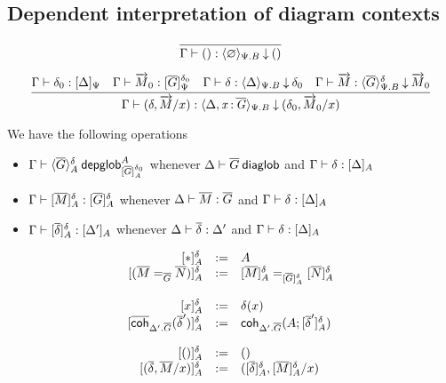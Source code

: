 \subsection{Dependent interpretation of diagram contexts}


\begin{small}
  \[\infer{\ofinterpdep{\Gamma}{()}{\emptyctx}{\Psi.B}{()}}{}\]

  \[
  \infer{\ofinterpdep{\Gamma}{(\delta,\tel M/x)}
    {\Delta,\tptm{x}{\diag G}}{\Psi.B}{(\delta_0,\tel M_0/x)}}
  {\ofinterp{\Gamma}{\delta_0}{\Delta}{\Psi}
    & \ofglob{\Gamma}{\tel M_0}{\interpglob{\diag G}{\Psi}{\delta_0}}
    & \ofinterpdep{\Gamma}{\delta}{\Delta}{\Psi.B}{\delta_0}
    & \ofdepglob{\Gamma}{\tel M}{\interpdepglob{\diag G}{\Psi.B}{\delta}}{\tel
    M_0}}
    \]
\end{small}

We have the following operations

\begin{itemize}
\item ${\Gamma} \vdash {\langle {\ensuremath{\overline{G}}}\rangle_{A}^{\delta}} \: \mathsf{depglob}^{A}_{
        [{\overline{G}}]_{A}^{\delta_0}}$ whenever
  ${\Delta} \vdash {\ensuremath{\overline{G}}} \: \mathsf{diaglob}$ and ${\Gamma} \vdash {\delta} : {[ \Delta ]_{A}}$
\item ${\Gamma} \vdash {[{\ensuremath{\overline{M}}}]_{A}^{\delta}} : {} {[{\overline{G}}]_{A}^{\delta}}$ whenever ${\Delta} \vdash {\ensuremath{\overline{M}}} : {\overline{G}}$ and
  ${\Gamma} \vdash {\delta} : {[ \Delta ]_{A}}$
\item ${\Gamma} \vdash {[{\ensuremath{\overline{\delta}}}]_{A}^{\delta}} : {[ \Delta' ]_{A}}$
  whenever ${\Delta} \vdash {\ensuremath{\overline{\delta}}} : {\Delta'}$ and
  ${\Gamma} \vdash {\delta} : {[ \Delta ]_{A}}$
\end{itemize}

\begin{small}
  \[
  \begin{array}{rcl}
    \interpglob{\diagbase}{A}{\delta} & := & A \\
    \interpglob{(\homj{\diag G}{\diag M}{\diag N})}{A}{\delta} & := &
    \homj{\interpglob{\diag G}{A}{\delta}}{\interpglob{\diag M}{A}{\delta}}
    {\interpglob{\diag N}{A}{\delta}}\\\\

    \interpglob{x}{A}{\delta} & := & \delta(x) \\
    \interpglob{\diagcoh{\Delta'.\diag{G}}{\diag \delta'}}{A}{\delta} & := &
    \coh{\Delta'.\diag G}{A}{\interpglob{\diag\delta'}{A}{\delta}}\\\\

    \interpglob{()}{A}{\delta} & := & () \\
    \interpglob{(\diag \delta,\diag M/x)}{A}{\delta} & := &
    (\interpglob{\diag\delta}{A}{\delta},\interpglob{\diag M}{A}{\delta}/x)
  \end{array}
  \]
\end{small}

